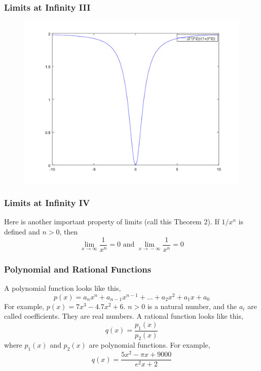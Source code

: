 \documentclass[xcolor=dvipsnames]{beamer}
\begin{document}
\begin{frame}
  \frametitle{Limits at Infinity III}
  \begin{figure}[h]
    \includegraphics[scale=.5]{./lai.png}
  \end{figure}
\end{frame}

\begin{frame}
  \frametitle{Limits at Infinity IV}
Here is another important property of limits (call this \alert{Theorem
2}). If $1/x^{n}$ is defined and $n>0$, then
\begin{equation}
  \label{eq:faingiej}
  \lim_{x\rightarrow{}\infty}\frac{1}{x^{n}}=0\mbox{ and }\lim_{x\rightarrow{}-\infty}\frac{1}{x^{n}}=0
\end{equation}
\end{frame}

\begin{frame}
  \frametitle{Polynomial and Rational Functions}
A polynomial function looks like this,
\begin{equation}
  \label{eq:kaimeeyo}
  p(x)=a_{n}x^{n}+a_{n-1}x^{n-1}+\ldots{}+a_{2}x^{2}+a_{1}x+a_{0}
\end{equation}
For example, $p(x)=7x^{3}-4.7x^{2}+6$. $n>0$ is a natural number, and
the $a_{i}$ are called \alert{coefficients}. They are real numbers.
A rational function looks like this,
\begin{equation}
  \label{eq:raephoot}
  q(x)=\frac{p_{1}(x)}{p_{2}(x)}
\end{equation}
where $p_{1}(x)$ and $p_{2}(x)$ are polynomial functions. For example,
\begin{equation}
  \label{eq:yaingiaj}
  q(x)=\frac{5x^{2}-\pi{}x+9000}{e^{2}x+2}
\end{equation}
\end{frame}
\end{document}
